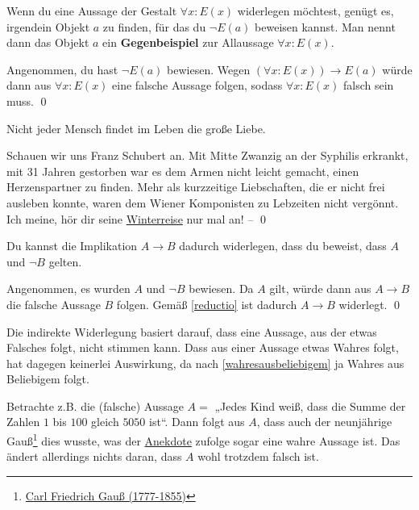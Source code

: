 \begin{satz} \label{gegenbeispiel} 
    Wenn du eine Aussage der Gestalt $\forall x: E(x)$ widerlegen möchtest, genügt es, irgendein Objekt $a$ zu finden, für das du $\neg E(a)$ beweisen kannst. Man nennt dann das Objekt $a$ ein \textbf{Gegenbeispiel} zur Allaussage $\forall x: E(x)$.
\end{satz}


\begin{bew}
    Angenommen, du hast $\neg E(a)$ bewiesen. Wegen $(\forall x: E(x)) \to E(a)$ würde dann aus $\forall x:E(x)$ eine falsche Aussage folgen, sodass $\forall x:E(x)$ falsch sein muss. \qed
\end{bew}

 
\begin{bsp}
    Nicht jeder Mensch findet im Leben die große Liebe.
\end{bsp}


\begin{bew}
    Schauen wir uns Franz Schubert an. Mit Mitte Zwanzig an der Syphilis erkrankt, mit 31 Jahren gestorben war es dem Armen nicht leicht gemacht, einen Herzenspartner zu finden. Mehr als kurzzeitige Liebschaften, die er nicht frei ausleben konnte, waren dem Wiener Komponisten zu Lebzeiten nicht vergönnt. Ich meine, hör dir seine \href{https://youtu.be/F6I6Y1LhMKo?t=1665}{Winterreise} nur mal an! -- \qed 
\end{bew}


\begin{satz}
    Du kannst die Implikation $A\to B$ dadurch widerlegen, dass du beweist, dass $A$ und $\neg B$ gelten.
\end{satz}


\begin{bew}
    Angenommen, es wurden $A$ und $\neg B$ bewiesen. Da $A$ gilt, würde dann aus $A\to B$ die falsche Aussage $B$ folgen. Gemäß \cref{reductio} ist dadurch $A\to B$ widerlegt. \qed
\end{bew}


\begin{bem}[*]
    Die indirekte Widerlegung basiert darauf, dass eine Aussage, aus der etwas Falsches folgt, nicht stimmen kann. Dass aus einer Aussage etwas Wahres folgt, hat dagegen keinerlei Auswirkung, da nach \cref{wahresausbeliebigem} ja Wahres aus Beliebigem folgt.
    
    Betrachte z.B. die (falsche) Aussage $A=$ „Jedes Kind weiß, dass die Summe der Zahlen $1$ bis $100$ gleich $5050$ ist“. Dann folgt aus $A$, dass auch der neunjährige Gauß\footnote{\href{https://de.wikipedia.org/wiki/Carl_Friedrich_Gau\%C3\%9F}{Carl Friedrich Gauß (1777-1855)}} dies wusste, was der \href{https://de.wikipedia.org/wiki/Gau\%C3\%9Fsche_Summenformel#Herkunft_der_Bezeichnung}{Anekdote} zufolge sogar eine wahre Aussage ist. Das ändert allerdings nichts daran, dass $A$ wohl trotzdem falsch ist.
\end{bem}



